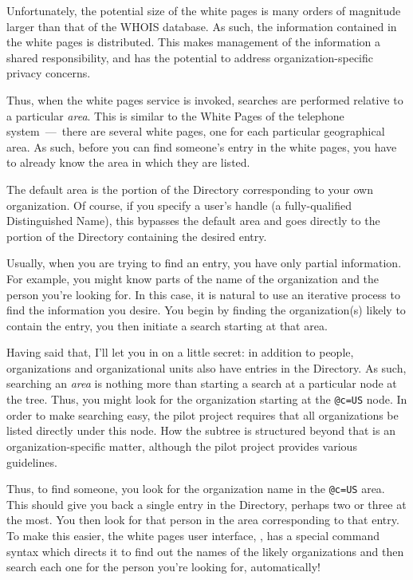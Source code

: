 Unfortunately,
the potential size of the white pages is many orders of magnitude larger than
that of the WHOIS database.
As such,
the information contained in the white pages is distributed.
This makes management of the information a shared responsibility,
and has the potential to address organization-specific privacy concerns.

Thus,
when the white pages service is invoked,
searches are performed relative to a particular {\em area}.
This is similar to the White Pages of the telephone system~---~there are
several white pages, one for each particular geographical area.
As such,
before you can find someone's entry in the white pages,
you have to already know the area in which they are listed.

The default area is the portion of the Directory corresponding to your own
organization.
Of course,
if you specify a user's handle (a fully-qualified Distinguished Name),
this bypasses the default area and goes directly to the portion of
the Directory containing the desired entry.

Usually,
when you are trying to find an entry,
you have only partial information.
For example,
you might know parts of the name of the organization and the person you're
looking for.
In this case,
it is natural to use an iterative process to find the information you desire.
You begin by finding the organization(s) likely to contain the entry,
you then initiate a search starting at that area.

Having said that,
I'll let you in on a little secret:
in addition to people,
organizations and organizational units also have entries in the Directory.
As such,
searching an {\em area\/} is nothing more than starting a search at a
particular node at the tree.
Thus,
you might look for the organization starting at the \verb"@c=US" node.
In order to make searching easy,
the pilot project requires that all organizations be listed directly under
this node.
How the subtree is structured beyond that is an organization-specific matter,
although the pilot project provides various guidelines.

Thus,
to find someone,
you look for the organization name in the \verb"@c=US" area.
This should give you back a single entry in the Directory,
perhaps two or three at the most.
You then look for that person in the area corresponding to that entry.
To make this easier,
the white pages user interface, , has a special command syntax
which directs it to find out the names of the likely organizations and then
search each one for the person you're looking for, automatically!

